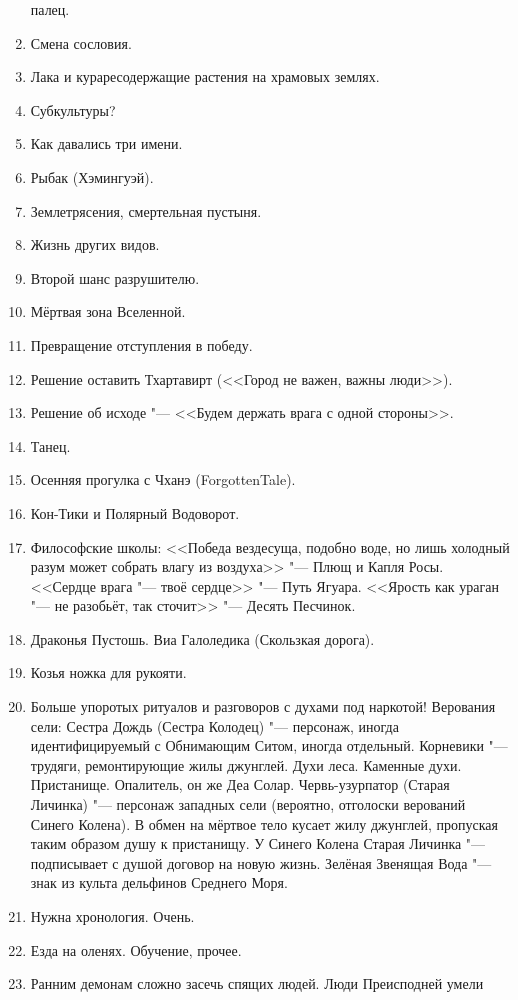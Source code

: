 \documentclass[a4paper,10pt]{book}
\begin{document}
\begin{enumerate}
палец.
\item Смена сословия.
\item Лака и кураресодержащие растения на храмовых землях.
\item Субкультуры?
\item Как давались три имени.
\item Рыбак (Хэмингуэй).
\item Землетрясения, смертельная пустыня.
\item Жизнь других видов.
\item Второй шанс разрушителю.
\item Мёртвая зона Вселенной.
\item Превращение отступления в победу.
\item Решение оставить Тхартавирт (<<Город не важен, важны люди>>).
\item Решение об исходе "--- <<Будем держать врага с одной стороны>>.
\item Танец.
\item Осенняя прогулка с Чханэ (ForgottenTale).
\item Кон-Тики и Полярный Водоворот.
\item Философские школы: <<Победа вездесуща, подобно воде, но лишь холодный 
разум может собрать влагу из воздуха>> "--- Плющ и Капля Росы. <<Сердце врага 
"--- твоё сердце>> "--- Путь Ягуара. <<Ярость как ураган "--- не разобьёт, так сточит>> "--- Десять Песчинок.
\item Драконья Пустошь. Виа Галоледика (Скользкая дорога).
\item Козья ножка для рукояти.
\item Больше упоротых ритуалов и разговоров с духами под наркотой! Верования 
сели:
Сестра Дождь (Сестра Колодец) "--- персонаж, иногда идентифицируемый с 
Обнимающим Ситом, иногда отдельный.
Корневики "--- трудяги, ремонтирующие жилы джунглей.
Духи леса.
Каменные духи.
Пристанище.
Опалитель, он же Деа Солар.
Червь-узурпатор (Старая Личинка) "--- персонаж западных сели (вероятно, 
отголоски верований Синего Колена). В обмен на мёртвое тело кусает жилу 
джунглей, пропуская таким образом душу к пристанищу. У Синего Колена Старая 
Личинка "--- подписывает с душой договор на новую жизнь.
Зелёная Звенящая Вода "--- знак из культа дельфинов Среднего Моря.
\item Нужна хронология. Очень.
\item Езда на оленях. Обучение, прочее.
\item Ранним демонам сложно засечь спящих людей. Люди Преисподней умели 

\end{enumerate}
\end{document}
